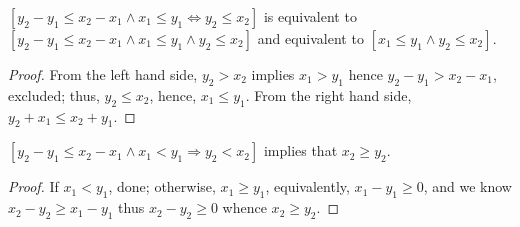 \documentclass[pagesize, twoside=off, bibliography=totoc, DIV=calc, fontsize=12pt, a4paper]{scrartcl}
\begin{document}
\begin{lemma}
	\label{th:eqToEq}
	$[y_2 - y_1 ≤ x_2 - x_1 \land x_1 ≤ y_1 ⇔ y_2 ≤ x_2]$ is equivalent to $[y_2 - y_1 ≤ x_2 - x_1 \land x_1 ≤ y_1 \land y_2 ≤ x_2]$ and equivalent to $[x_1 ≤ y_1 \land y_2 ≤ x_2]$.
\end{lemma}
\begin{proof}
	From the left hand side, $y_2 > x_2$ implies $x_1 > y_1$ hence $y_2 - y_1 > x_2 - x_1$, excluded; thus, $y_2 ≤ x_2$, hence, $x_1 ≤ y_1$. From the right hand side, $y_2 + x_1 ≤ x_2 + y_1$.
\end{proof}

\begin{lemma}
	\label{th:simpleImpl}
	$[y_2 - y_1 ≤ x_2 - x_1 \land x_1 < y_1 ⇒ y_2 < x_2]$ implies that $x_2 ≥ y_2$.
\end{lemma}
\begin{proof}
	If $x_1 < y_1$, done; otherwise, $x_1 ≥ y_1$, equivalently, $x_1 - y_1 ≥ 0$, and we know $x_2 - y_2 ≥ x_1 - y_1$ thus $x_2 - y_2 ≥ 0$ whence $x_2 ≥ y_2$.
\end{proof}
\end{document}
